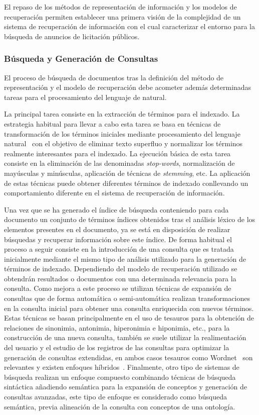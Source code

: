 El repaso de los métodos de representación de información y los modelos de recuperación 
permiten establecer una primera visión de la complejidad de un sistema de recuperación 
de información con el cual caracterizar el entorno para la búsqueda de anuncios 
de licitación públicos.

\subsubsection{Búsqueda y Generación de Consultas}
El proceso de búsqueda de documentos tras la definición del método de representación y el 
modelo de recuperación debe acometer además determinadas tareas para el procesamiento 
del lenguaje de natural. 

La principal tarea consiste en la extracción de términos para el indexado. 
La estrategia habitual para llevar a cabo esta tarea se basa en técnicas de transformación de los términos iniciales 
mediante procesamiento del lenguaje natural~\cite{Wilcock:2009:ILA:1717999} con el 
objetivo de eliminar texto superfluo y normalizar los términos realmente interesantes 
para el indexado. La ejecución básica de esta tarea consiste en la eliminación 
de las denominadas \textit{stop-words}, normalización de mayúsculas y minúsculas, 
aplicación de técnicas de \textit{stemming}, etc. La aplicación de estas 
técnicas puede obtener diferentes términos de indexado conllevando un comportamiento 
diferente en el sistema de recuperación de información.

Una vez que se ha generado el índice de búsqueda conteniendo para cada documento 
un conjunto de términos índices obtenidos tras el análisis léxico de los elementos 
presentes en el documento, ya se está en disposición de realizar búsquedas y 
recuperar información sobre este índice. De forma habitual el proceso a seguir consiste 
en la introducción de una consulta que es tratada inicialmente mediante el mismo tipo de análisis 
utilizado para la generación de términos de indexado. Dependiendo del modelo 
de recuperación utilizado se obtendrán resultados o documentos con una determinada 
relevancia para la consulta. Como mejora a este proceso se utilizan técnicas de 
expansión de consultas que de forma automática o semi-automática realizan transformaciones 
en la consulta inicial para obtener una consulta enriquecida con nuevos términos. Estas 
técnicas se basan principalmente en el uso de tesauros para la obtención de relaciones de sinonimia, 
antonimia, hiperonimia e hiponimia, etc., para la construcción de una nueva 
consulta, también se suele utilizar la realimentación del usuario 
y el estudio de los registros de las consultas para optimizar la generación 
de consultas extendidas, en ambos casos tesauros como Wordnet~\cite{Gong:Cheang:U:2006} son relevantes 
y existen enfoques híbridos~\cite{Lisa2010}. Finalmente, otro tipo de sistemas de búsqueda realizan 
un enfoque compuesto combinando técnicas de búsqueda sintáctica añadiendo semántica para la expansión 
de conceptos y generación de consultas avanzadas, este tipo de enfoque es considerado como 
búsqueda semántica, previa alineación de la consulta con conceptos de una ontología.

